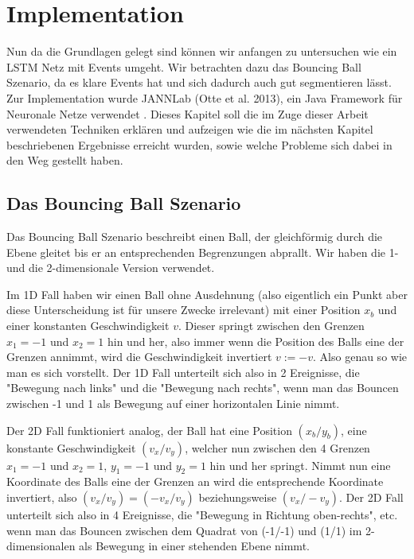 \chapter{Implementation}
Nun da die Grundlagen gelegt sind können wir anfangen zu untersuchen wie ein LSTM Netz mit Events umgeht. Wir betrachten dazu das Bouncing Ball Szenario, da es klare Events hat und sich dadurch auch gut segmentieren lässt. Zur Implementation wurde JANNLab (Otte et al. 2013), ein Java Framework für Neuronale Netze verwendet \cite{bib:jannlab}. Dieses Kapitel soll die im Zuge dieser Arbeit verwendeten Techniken erklären und aufzeigen wie die im nächsten Kapitel beschriebenen Ergebnisse erreicht wurden, sowie welche Probleme sich dabei in den Weg gestellt haben.

\section{Das Bouncing Ball Szenario}
Das Bouncing Ball Szenario beschreibt einen Ball, der gleichförmig durch die Ebene gleitet bis er an entsprechenden Begrenzungen abprallt. Wir haben die 1- und die 2-dimensionale Version verwendet.

Im 1D Fall haben wir einen Ball ohne Ausdehnung (also eigentlich ein Punkt aber diese Unterscheidung ist für unsere Zwecke irrelevant) mit einer Position $ x_{b} $ und einer konstanten Geschwindigkeit $  v$. Dieser springt zwischen den Grenzen $ x_{1}=-1 $ und $ x_{2}=1 $ hin und her, also immer wenn die Position des Balls eine der Grenzen annimmt, wird die Geschwindigkeit invertiert $ v := -v $. Also genau so wie man es sich vorstellt. Der 1D Fall unterteilt sich also in 2 Ereignisse, die "Bewegung nach links" und die "Bewegung nach rechts", wenn man das Bouncen zwischen -1 und 1 als Bewegung auf einer horizontalen Linie nimmt.

Der 2D Fall funktioniert analog, der Ball hat eine Position $ (x_{b}/y_{b}) $, eine konstante Geschwindigkeit $ (v_{x}/v_{y}) $, welcher nun zwischen den 4 Grenzen $ x_{1}=-1 $ und $ x_{2}=1 $, $ y_{1}=-1 $ und $ y_{2}=1 $ hin und her springt. Nimmt nun eine Koordinate des Balls eine der Grenzen an wird die entsprechende Koordinate invertiert, also $ (v_{x}/v_{y}) = (-v_{x}/v_{y}) $ beziehungsweise $ (v_{x}/-v_{y}) $. Der 2D Fall unterteilt sich also in 4 Ereignisse, die "Bewegung in Richtung oben-rechts", etc. wenn man das Bouncen zwischen dem Quadrat von (-1/-1) und (1/1) im 2-dimensionalen als Bewegung in einer stehenden Ebene nimmt.

